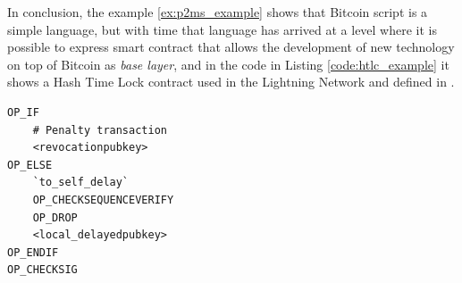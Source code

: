 In conclusion, the example \ref{ex:p2ms_example} shows that Bitcoin script is a simple
language, but with time that language has arrived at a level where it is possible to
express smart contract that allows the development of new technology on top of Bitcoin as \emph{base layer},
and in the code in Listing \ref{code:htlc_example} it shows a Hash Time Lock contract used in the Lightning Network
and defined in \cite{lightning-network-paper}.


\begin{lstlisting}[language=bitcoinscript, caption={Hash Time Lock contract first example.}, label={code:htlc_example}]
OP_IF
    # Penalty transaction
    <revocationpubkey>
OP_ELSE
    `to_self_delay`
    OP_CHECKSEQUENCEVERIFY
    OP_DROP
    <local_delayedpubkey>
OP_ENDIF
OP_CHECKSIG
\end{lstlisting}



